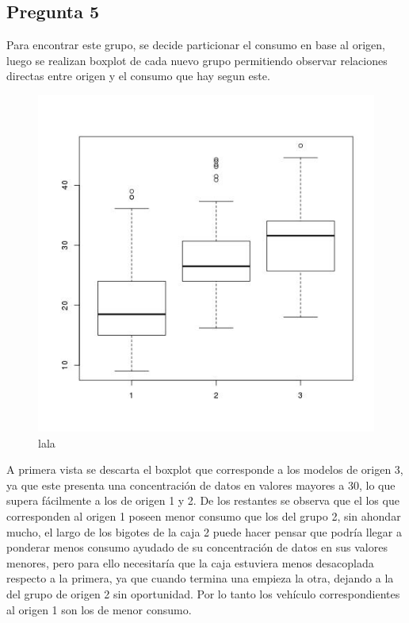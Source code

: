 \documentclass[letter,10pt]{article}
\begin{document}
\newpage
\subsection{Pregunta 5}

Para encontrar este grupo, se decide particionar el consumo en base al origen, luego se realizan boxplot de cada nuevo grupo
permitiendo observar relaciones directas entre origen y el consumo que hay segun este.
\begin{figure}[h!]
    \centering
    \includegraphics[scale=0.5]{boxplot_mpg_origin.jpg}
    \caption{lala}
    \label{fig:lala}
\end{figure}
A primera vista se descarta el boxplot que corresponde a los modelos de origen 3, ya que este presenta una concentración de datos en valores
mayores a 30, lo que supera fácilmente a los de origen 1 y 2.
De los restantes se observa que el los que corresponden al origen 1 poseen menor consumo que los del grupo 2, sin ahondar mucho,
el largo de los bigotes de la caja 2 puede hacer pensar que podría llegar a ponderar menos consumo ayudado de su concentración de datos
en sus valores menores, pero para ello necesitaría que la caja estuviera menos desacoplada respecto a la primera, ya que cuando termina una empieza la otra,
dejando a la del grupo de origen 2 sin oportunidad. Por lo tanto los vehículo correspondientes al origen 1 son los de menor consumo.
\end{document}
